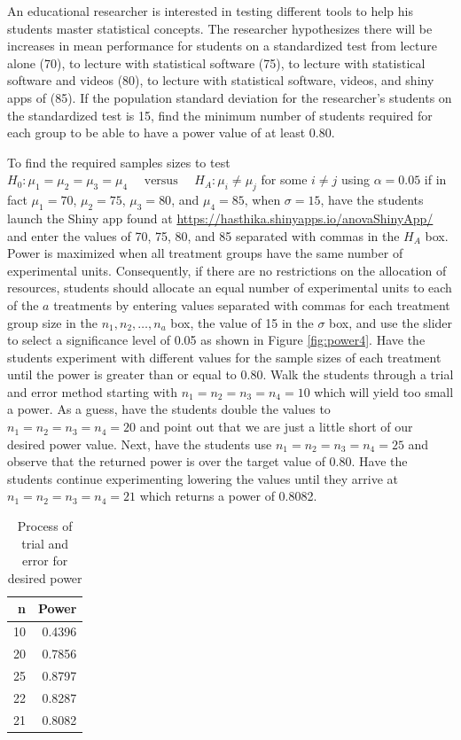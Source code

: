 \documentclass[
]{article}
\begin{document}
An educational researcher is interested in testing different tools to help his students master statistical concepts. The researcher hypothesizes there will be increases in mean performance for students on a standardized test from lecture alone (70), to lecture with statistical software (75), to lecture with statistical software and videos (80), to lecture with statistical software, videos, and shiny apps of (85). If the population standard deviation for the researcher's students on the standardized test is 15, find the minimum number of students required for each group to be able to have a power value of at least 0.80.

To find the required samples sizes to test \(H_0: \mu_1 = \mu_2 = \mu_3 = \mu_4 \quad\text{ versus }\quad H_A: \mu_i \neq \mu_j\) for some \(i \neq j\) using \(\alpha = 0.05\) if in fact \(\mu_1 = 70\), \(\mu_2 = 75\), \(\mu_3 = 80\), and \(\mu_4 = 85\), when \(\sigma = 15\), have the students launch the Shiny app found at \url{https://hasthika.shinyapps.io/anovaShinyApp/} and enter the values of 70, 75, 80, and 85 separated with commas in the \(H_A\) box. Power is maximized when all treatment groups have the same number of experimental units. Consequently, if there are no restrictions on the allocation of resources, students should allocate an equal number of experimental units to each of the \(a\) treatments by entering values separated with commas for each treatment group size in the \(n_1, n_2,\ldots, n_a\) box, the value of 15 in the \(\sigma\) box, and use the slider to select a significance level of 0.05 as shown in Figure \ref{fig:power4}. Have the students experiment with different values for the sample sizes of each treatment until the power is greater than or equal to 0.80. Walk the students through a trial and error method starting with \(n_1 = n_2 = n_3 = n_4 = 10\) which will yield too small a power. As a guess, have the students double the values to \(n_1 = n_2 = n_3 = n_4 = 20\) and point out that we are just a little short of our desired power value. Next, have the students use \(n_1 = n_2 = n_3 = n_4 = 25\) and observe that the returned power is over the target value of 0.80. Have the students continue experimenting lowering the values until they arrive at \(n_1 = n_2 = n_3 = n_4 = 21\) which returns a power of 0.8082.

\begin{table}

\caption{\label{tab:unnamed-chunk-6}Process of trial and error for desired power}
\centering
\begin{tabular}[t]{rr}
\toprule
n & Power\\
\midrule
10 & 0.4396\\
20 & 0.7856\\
25 & 0.8797\\
22 & 0.8287\\
21 & 0.8082\\
\bottomrule
\end{tabular}
\end{table}
\end{document}
